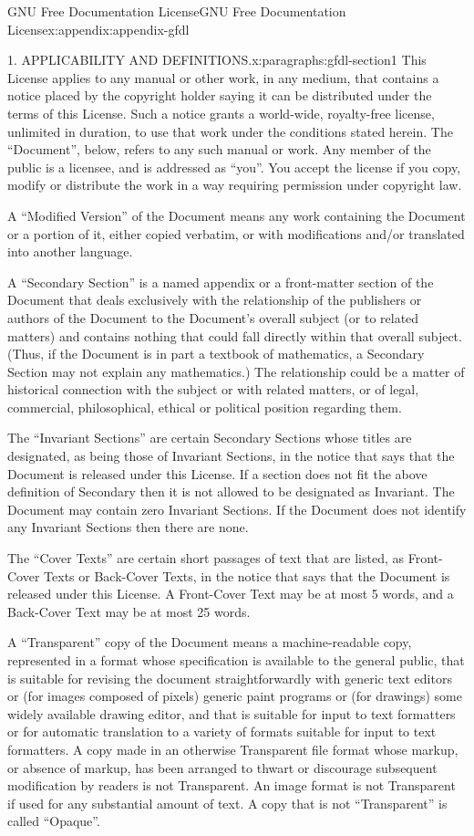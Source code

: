 \documentclass[twoside,10pt,]{tufte-book}
\numberwithin{equation}{part}
\begin{document}
\begin{appendixptx}{GNU Free Documentation License}{}{GNU Free Documentation License}{}{}{x:appendix:appendix-gfdl}
\begin{paragraphs}{1. APPLICABILITY AND DEFINITIONS.}{x:paragraphs:gfdl-section1}
This License applies to any manual or other work, in any medium, that contains a notice placed by the copyright holder saying it can be distributed under the terms of this License. Such a notice grants a world-wide, royalty-free license, unlimited in duration, to use that work under the conditions stated herein. The ``Document'', below, refers to any such manual or work. Any member of the public is a licensee, and is addressed as ``you''. You accept the license if you copy, modify or distribute the work in a way requiring permission under copyright law.%
\par
A ``Modified Version'' of the Document means any work containing the Document or a portion of it, either copied verbatim, or with modifications and\slash{}or translated into another language.%
\par
A ``Secondary Section'' is a named appendix or a front-matter section of the Document that deals exclusively with the relationship of the publishers or authors of the Document to the Document's overall subject (or to related matters) and contains nothing that could fall directly within that overall subject. (Thus, if the Document is in part a textbook of mathematics, a Secondary Section may not explain any mathematics.) The relationship could be a matter of historical connection with the subject or with related matters, or of legal, commercial, philosophical, ethical or political position regarding them.%
\par
The ``Invariant Sections'' are certain Secondary Sections whose titles are designated, as being those of Invariant Sections, in the notice that says that the Document is released under this License. If a section does not fit the above definition of Secondary then it is not allowed to be designated as Invariant. The Document may contain zero Invariant Sections. If the Document does not identify any Invariant Sections then there are none.%
\par
The ``Cover Texts'' are certain short passages of text that are listed, as Front-Cover Texts or Back-Cover Texts, in the notice that says that the Document is released under this License. A Front-Cover Text may be at most 5 words, and a Back-Cover Text may be at most 25 words.%
\par
A ``Transparent'' copy of the Document means a machine-readable copy, represented in a format whose specification is available to the general public, that is suitable for revising the document straightforwardly with generic text editors or (for images composed of pixels) generic paint programs or (for drawings) some widely available drawing editor, and that is suitable for input to text formatters or for automatic translation to a variety of formats suitable for input to text formatters. A copy made in an otherwise Transparent file format whose markup, or absence of markup, has been arranged to thwart or discourage subsequent modification by readers is not Transparent. An image format is not Transparent if used for any substantial amount of text. A copy that is not ``Transparent'' is called ``Opaque''.%

\end{paragraphs}
\end{appendixptx}
\end{document}
